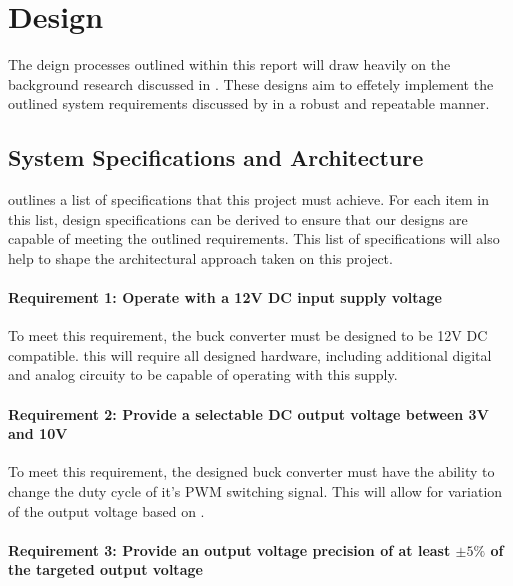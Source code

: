 \chapter{Design}\label{C:design}

The deign processes outlined within this report will draw heavily on the background research discussed in . These designs aim to effetely implement the outlined system requirements discussed by  in a robust and repeatable manner.


%
%

\section{System Specifications and Architecture}\label{S:specs_design}

 outlines a list of specifications that this project must achieve. For each item in this list, design specifications can be derived to ensure that our designs are capable of meeting the outlined requirements. This list of specifications will also help to shape the architectural approach taken on this project.


\subsubsection*{Requirement 1: Operate with a 12V DC input supply voltage}

To meet this requirement, the buck converter must be designed to be 12V DC compatible. this will require all designed hardware, including additional digital and analog circuity to be capable of operating with this supply.

\subsubsection*{Requirement 2: Provide a selectable DC output voltage between 3V and 10V}

To meet this requirement, the designed buck converter must have the ability to change the duty cycle of it's PWM switching signal. This will allow for variation of the output voltage based on .

\subsubsection*{Requirement 3: Provide an output voltage precision of at least $\pm5\%$ of the targeted output voltage}

